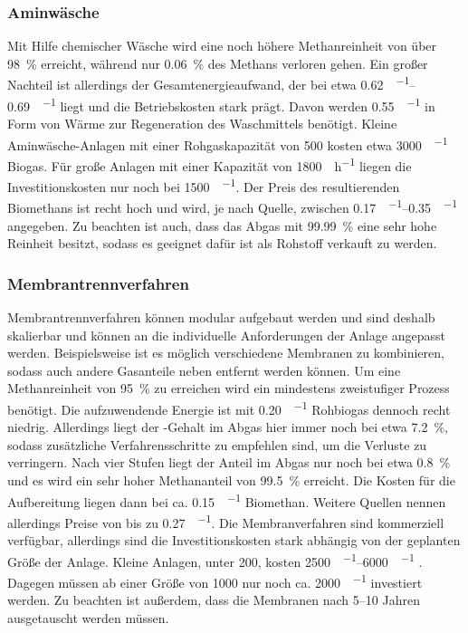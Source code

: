\subsubsection{Aminwäsche}
Mit Hilfe chemischer Wäsche wird eine noch höhere Methanreinheit von über \SI{98}{\percent} erreicht, während nur \SI{0,06}{\percent} des Methans verloren gehen. Ein großer Nachteil ist allerdings der Gesamtenergieaufwand, der bei etwa \SIrange{0,62}{0,69}{\kwh\per\normvol} liegt und die Betriebskosten stark prägt. Davon werden \SI{0,55}{\kwh\per\normvol} in Form von Wärme zur Regeneration des Waschmittels benötigt. Kleine Aminwäsche-Anlagen mit einer Rohgaskapazität von \SI{500}{\normvolh} kosten etwa \SI{3000}{\sieuro\per\normvolh} Biogas. Für große Anlagen mit einer Kapazität von \SI{1800}{\normvol\per\hour} liegen die Investitionskosten nur noch bei \SI{1500}{\sieuro\per\normvolh}. Der Preis des resultierenden Biomethans ist recht hoch und wird, je nach Quelle, zwischen \SIrange{0,17}{0,35}{\sieuro\per\normvol} angegeben. Zu beachten ist auch, dass das Abgas mit \SI{99,99}{\percent} eine sehr hohe  Reinheit besitzt, sodass es geeignet dafür ist als Rohstoff verkauft zu werden. \parencite{Emp18} \parencite{BHPT13} \parencite{DSW15} \parencite{KGKK2019} \parencite{Coll17}


\subsubsection{Membrantrennverfahren}
Membrantrennverfahren können modular aufgebaut werden und sind deshalb skalierbar und können an die individuelle Anforderungen der Anlage angepasst werden. Beispielsweise ist es möglich verschiedene Membranen zu kombinieren, sodass auch andere Gasanteile neben  entfernt werden können. Um eine Methanreinheit von \SI{95}{\percent} zu erreichen wird ein mindestens zweistufiger Prozess benötigt. Die aufzuwendende Energie ist mit \SI{0,20}{\kwh\per\normvol} Rohbiogas dennoch recht niedrig. Allerdings liegt der -Gehalt im Abgas hier immer noch bei etwa \SI{7,2}{\percent}, sodass zusätzliche Verfahrensschritte zu empfehlen sind, um die Verluste zu verringern. Nach vier Stufen liegt der Anteil im Abgas nur noch bei etwa \SI{0,8}{\percent} und es wird ein sehr hoher Methananteil von \SI{99,5}{\percent} erreicht. Die Kosten für die Aufbereitung liegen dann bei ca. \SI{0,15}{\sieuro\per\normvol} Biomethan. Weitere Quellen nennen allerdings Preise von bis zu \SI{0,27}{\sieuro\per\normvol}. Die Membranverfahren sind kommerziell verfügbar, allerdings sind die Investitionskosten stark abhängig von der geplanten Größe der Anlage. Kleine Anlagen, unter \SI{200}{\normvolh}, kosten \SIrange{2500}{6000}{\sieuro\per\normvolh} \parencite{BHPT13}. Dagegen müssen ab einer Größe von \SI{1000}{\normvolh} nur noch ca. \SI{2000}{\sieuro\per\normvolh} investiert werden. Zu beachten ist außerdem, dass die Membranen nach \SIrange{5}{10}{\relax} Jahren ausgetauscht werden müssen. \parencite{Emp18} \parencite{BHPT13} \parencite{KGKK2019} \parencite{Miltner2016}



